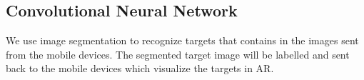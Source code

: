 %


\subsection{Convolutional Neural Network}
We use image segmentation to recognize targets that contains in the images sent from the mobile devices.
The segmented target image will be labelled and sent back to the mobile devices
which visualize the targets in AR.


